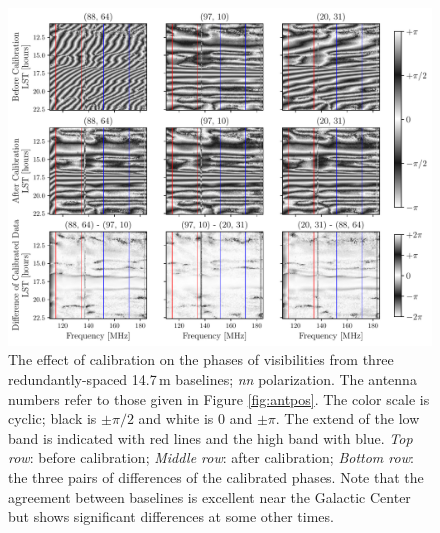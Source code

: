 \documentclass[twocolumn, trackchanges]{aastex61}
\begin{document}
\begin{figure}
\centering
\includegraphics[scale=0.38]{calibration_on_phases_noflags.pdf}
\caption{ The effect of calibration on the phases of visibilities from three
  redundantly-spaced 14.7\,m baselines; \textit{nn} polarization.  The antenna
  numbers refer to those given in Figure \ref{fig:antpos}.  The color scale is
  cyclic; black is $\pm\pi/2$ and white is 0 and $\pm\pi$. The extend of the low
  band is indicated with red lines and the high band with blue.  \textit{Top
    row}: before calibration; \textit{Middle row}: after calibration;
  \textit{Bottom row}: the three pairs of differences of the calibrated phases.
  Note that the agreement between baselines is excellent near the Galactic
  Center but shows significant differences at some other times.  }
\label{fig:phasecal}
\end{figure}
\end{document}
